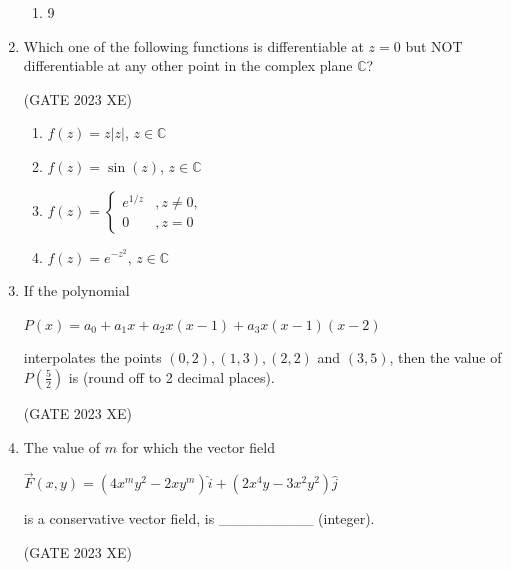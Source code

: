 \documentclass[journal,12pt,onecolumn]{IEEEtran}
\begin{document}
\begin{enumerate}
\begin{multicols}{2}
\begin{enumerate}
\item 9

\end{enumerate}

\end{multicols}

\item Which one of the following functions is differentiable at $z=0$ but NOT
differentiable at any other point in the complex plane $\mathbb{C}$?

\hfill{(GATE 2023 XE)}

\begin{multicols}{2}

\begin{enumerate}

\item $f(z) = z |z|$, $z \in \mathbb{C}$

\item $f(z) = \sin(z)$, $z \in \mathbb{C}$

\item $f(z)=
         \begin{cases}
       e^{1/z} & , z\neq 0,\\
         0 & , z=0
        \end{cases}$

\item $f(z) = e^{-z^2}$, $z \in \mathbb{C}$

\end{enumerate}

\end{multicols}

\item If the polynomial

$P(x) = a_0 + a_1 x + a_2 x(x-1) + a_3 x(x-1)(x-2)$

interpolates the points $(0,2), (1,3), (2,2)$ and $(3,5)$, then the value of $P(\frac{5}{2})$ is \underline{\hspace{3cm}} (round off to 2 decimal places).

\hfill{(GATE 2023 XE)}

\newpage

\item The value of $m$ for which the vector field

$\vec{F}(x,y) = (4x^m y^2 - 2 x y^m) \hat{i} + (2 x^4 y - 3 x^2 y^2) \hat{j}$

is a conservative vector field, is \_\_\_\_\_\_\_\_\_ (integer).

\hfill{(GATE 2023 XE)}


\end{enumerate}
\end{document}
